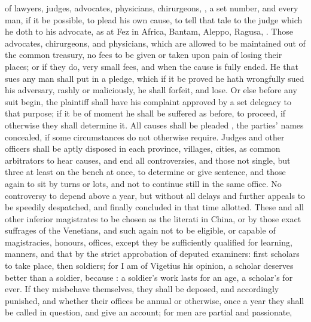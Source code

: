 of lawyers, judges, advocates, physicians, chirurgeons,
\etc{}, a set number, and every man, if it be possible, to
plead his own cause, to tell that tale to the judge which he doth to his
advocate, as at Fez in Africa, Bantam, Aleppo, Ragusa, . Those advocates, chirurgeons, and
physicians, which are allowed to be maintained out of the
common treasury, no fees to be given or taken upon pain of
losing their places; or if they do, very small fees, and when the
cause is fully ended. He that sues any
man shall put in a pledge, which if it be proved he hath wrongfully sued his
adversary, rashly or maliciously, he shall forfeit, and lose. Or else before
any suit begin, the plaintiff shall have his complaint approved by a set
delegacy to that purpose; if it be of moment he shall be suffered as before, to
proceed, if otherwise they shall determine it. All causes shall be pleaded
, the parties' names concealed, if some circumstances do
not otherwise require. Judges and other officers shall be aptly disposed in
each province, villages, cities, as common arbitrators to hear causes, and end
all controversies, and those not single, but three at least on the bench at
once, to determine or give sentence, and those again to sit by turns or lots,
and not to continue still in the same office. No controversy to depend above a
year, but without all delays and further appeals to be speedily despatched, and
finally concluded in that time allotted. These and all other inferior
magistrates to be chosen as the literati in China, or by
those exact suffrages of the Venetians, and such again not
to be eligible, or capable of magistracies, honours, offices, except they be
sufficiently qualified for learning, manners, and that by
the strict approbation of deputed examiners: first scholars
to take place, then soldiers; for I am of Vigetius his opinion, a scholar
deserves better than a soldier, because : a soldier's work
lasts for an age, a scholar's for ever. If they misbehave
themselves, they shall be deposed, and accordingly punished, and whether their
offices be annual or otherwise, once a year they shall be
called in question, and give an account; for men are partial and passionate,
